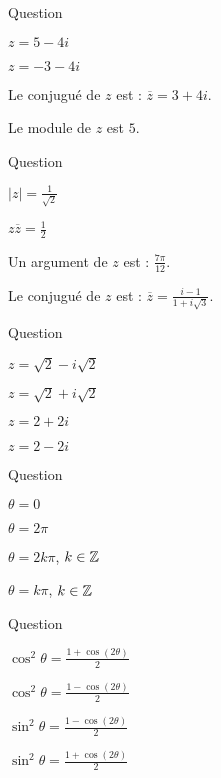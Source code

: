 

\begin{multi}[multiple,feedback=
{On développe \((1-2i)^2\). Si \(z=a+ib, a,b \in \Rr, \overline{z}=a-ib\)  et \(|z|^2= a^2+b^2\). 
}]{Question}
    \item \(z=5-4i\)
    \item* \(z=-3-4i\)
    \item Le conjugué de \(z\) est : \(\overline{z}=3+4i\).
    \item* Le module de \(z\) est \(5\).
\end{multi}


\begin{multi}[multiple,feedback=
{On applique les formules :
\(|\frac{z_1}{z_2}|= \frac{|z_1|}{|z_2|}\), \(|z|^2=z\overline{z}\) et \(\arg(\frac{z_1}{z_2})= \arg z_1 - \arg z_2 \, [2\pi]\). 
}]{Question}
    \item* \(|z|=\frac{1}{\sqrt 2}\)
    \item* \(z\overline{z} =\frac{1}{2}\)
    \item* Un argument de \(z\) est : \(\frac{7\pi}{12}\).
    \item Le conjugué de \(z\) est : \(\overline{z}=\frac{i-1}{1+i\sqrt 3}\).
\end{multi}


\begin{multi}[multiple,feedback=
{\(z=2(\cos\frac{\pi}{4}+i\sin\frac{\pi}{4}) =\sqrt 2+i\sqrt 2 \).
}]{Question}
    \item \(z= \sqrt 2-i\sqrt 2\)
    \item* \(z= \sqrt 2+i\sqrt 2\)
    \item \(z= 2+2i\)
    \item \(z= 2-2i\)
\end{multi}


\begin{multi}[multiple,feedback=
{\(e^{i\theta}= \cos \theta + i \sin \theta \) et \(\sin \theta = 0 \) si et seulement si \(\theta  =k\pi\), \(k \in \Zz\).
}]{Question}
    \item \(\theta  =0\)
    \item \(\theta  =2\pi\)
    \item \(\theta  = 2k\pi\), \(k \in \Zz\)
    \item* \(\theta  =k\pi\), \(k \in \Zz\)
\end{multi}


\begin{multi}[multiple,feedback=
{On peut appliquer les formules d'Euler, ou utiliser la formule d'addition du cosinus. 
}]{Question}
    \item* \(\cos^2\theta= \frac{1+\cos(2\theta)}{2}\)
    \item \(\cos^2\theta= \frac{1-\cos(2\theta)}{2}\)
    \item* \(\sin^2\theta= \frac{1-\cos(2\theta)}{2}\)
    \item \(\sin^2\theta= \frac{1+\cos(2\theta)}{2}\)
\end{multi}


